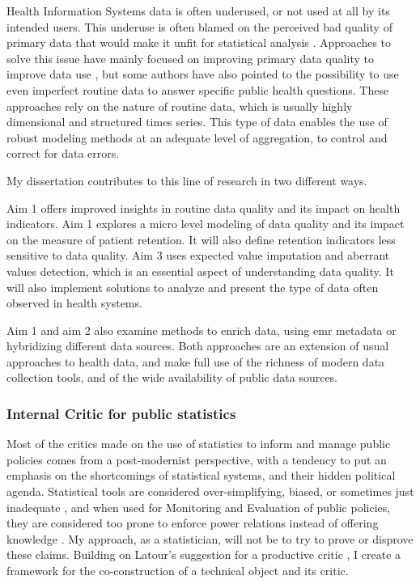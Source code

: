 Health Information Systems data is often underused, or not used at all by its intended users\citep{health_metrics_network_framework_2008}. This underuse is often blamed on the  perceived bad quality of primary data that would make it unfit for statistical analysis
\citep{ronveaux_immunization_2005,makombe_assessing_2008,heunis_accuracy_2011,gimbel_assessment_2011,who_assessment_2011,hahn_where_2013,kihuba_assessing_2014,glele_ahanhanzo_data_2015}. Approaches to solve this issue have mainly focused on improving primary data quality to improve data use  \citep{braa_improving_2012,mutale_improving_2013,ledikwe_improving_2014,nisingizwe_toward_2014}, but some authors have also pointed to the possibility to use even imperfect routine data to answer specific public health questions\citep{gething_improving_2006,gething_information_2007,wagenaar_using_2016}. These approaches rely on the nature of routine data, which is usually highly dimensional and structured times series. This type of data enables the use of robust modeling methods at an adequate level of aggregation, to control and correct for data errors.

My dissertation contributes to this line of research in two different ways.

Aim 1 offers improved insights in routine data quality and its impact on health indicators. Aim 1  explores a micro level modeling of data quality and its impact on the measure of patient retention. It will also define retention indicators less sensitive to data quality. Aim 3 uses expected value imputation and aberrant values detection, which is an essential aspect of understanding data quality. It will also implement solutions  to analyze and present the type of data often observed in health systems.

Aim 1 and aim 2 also examine methods to enrich data, using \gls{emr} metadata or  hybridizing different data sources. Both approaches are an extension of usual approaches to health data, and make full use of the richness of modern data collection tools, and of the wide availability of public data sources.

\subsubsection{Internal Critic for public statistics}

Most of the critics made on the use of statistics to inform and manage public policies comes from a post-modernist perspective, with a tendency to put an emphasis on the shortcomings of statistical systems, and their hidden political agenda. Statistical tools are considered over-simplifying, biased, or sometimes just inadequate \citep{merry_measuring_2011}, and when used for Monitoring and Evaluation of public policies, they are considered too prone to enforce power relations instead of offering knowledge \citep{desrosieres_prouver_2014,gaudilliere_nouvel_2016}. My approach, as a statistician, will not be to try to prove or disprove these claims. Building on Latour's suggestion for a productive critic \citep{latour_why_2004}, I create a framework for the co-construction of a technical object and its critic.

